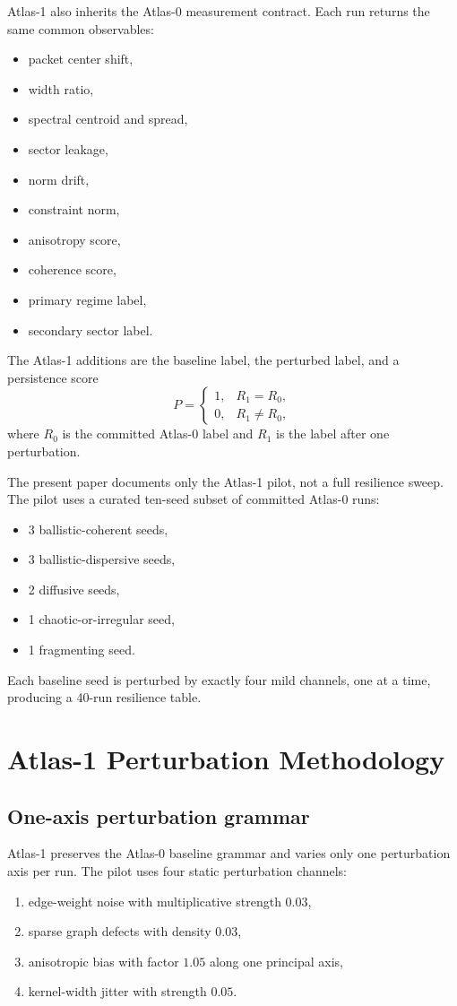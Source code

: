 \documentclass[11pt]{article}
\begin{document}
Atlas-1 also inherits the Atlas-0 measurement contract. Each run returns the same common observables:
\begin{itemize}
\item packet center shift,
\item width ratio,
\item spectral centroid and spread,
\item sector leakage,
\item norm drift,
\item constraint norm,
\item anisotropy score,
\item coherence score,
\item primary regime label,
\item secondary sector label.
\end{itemize}
The Atlas-1 additions are the baseline label, the perturbed label, and a persistence score
\begin{equation}
P =
\begin{cases}
1, & R_1 = R_0, \\
0, & R_1 \neq R_0,
\end{cases}
\end{equation}
where $R_0$ is the committed Atlas-0 label and $R_1$ is the label after one perturbation.

The present paper documents only the Atlas-1 pilot, not a full resilience sweep. The pilot uses a curated ten-seed subset of committed Atlas-0 runs:
\begin{itemize}
\item 3 ballistic-coherent seeds,
\item 3 ballistic-dispersive seeds,
\item 2 diffusive seeds,
\item 1 chaotic-or-irregular seed,
\item 1 fragmenting seed.
\end{itemize}
Each baseline seed is perturbed by exactly four mild channels, one at a time, producing a 40-run resilience table.

\section{Atlas-1 Perturbation Methodology}
\subsection{One-axis perturbation grammar}
Atlas-1 preserves the Atlas-0 baseline grammar and varies only one perturbation axis per run. The pilot uses four static perturbation channels:
\begin{enumerate}
\item edge-weight noise with multiplicative strength $0.03$,
\item sparse graph defects with density $0.03$,
\item anisotropic bias with factor $1.05$ along one principal axis,
\item kernel-width jitter with strength $0.05$.
\end{enumerate}
\end{document}
